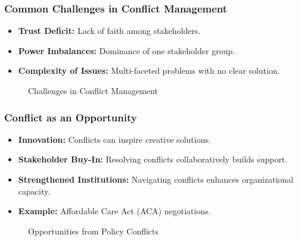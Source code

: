 \documentclass[10pt]{beamer}
\begin{document}
\begin{frame}
        \begin{frame}
        \frametitle{Common Challenges in Conflict Management}
        \begin{itemize}
            \item \textbf{Trust Deficit:} Lack of faith among stakeholders.
            \item \textbf{Power Imbalances:} Dominance of one stakeholder group.
            \item \textbf{Complexity of Issues:} Multi-faceted problems with no clear solution.
        \end{itemize}
        
        \begin{figure}
            \centering
            \caption{Challenges in Conflict Management}
        \end{figure}
        \end{frame}
        
        \begin{frame}
        \frametitle{Conflict as an Opportunity}
        \begin{itemize}
            \item \textbf{Innovation:} Conflicts can inspire creative solutions.
            \item \textbf{Stakeholder Buy-In:} Resolving conflicts collaboratively builds support.
            \item \textbf{Strengthened Institutions:} Navigating conflicts enhances organizational capacity.
            \item \textbf{Example:} Affordable Care Act (ACA) negotiations.
        \end{itemize}
        
        \begin{figure}
            \centering
            \caption{Opportunities from Policy Conflicts}
        \end{figure}
        \end{frame}
        

\end{frame}
\end{document}
